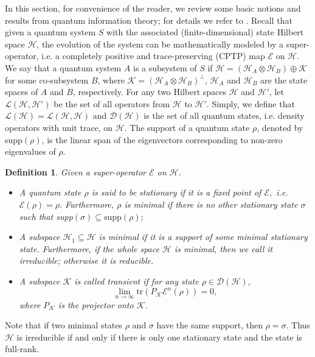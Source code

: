 \documentclass[journal]{IEEEtran}
\def\h{\ensuremath{\mathcal{H}}}
\def\l{\ensuremath{\mathcal{L}}}
\def\k{\ensuremath{\mathcal{K}}}
\def\e{\ensuremath{\mathcal{E}}}
\def\l{\ensuremath{\mathcal{L}}}
\def\d{\ensuremath{\mathcal{D}}}
\def\l{\mathcal{L}}
\def\k{\mathcal{K}}
\newtheorem{definition}{Definition}
\begin{document}
In this section, for convenience of the reader, we review some basic notions and results from quantum information theory; for details we refer to \cite{nielsen2010quantum}. Recall that given a quantum system $S$ with the associated (finite-dimensional) state Hilbert space $\h$, the evolution of the system can be mathematically  modeled by a super-operator, i.e. a completely positive  and trace-preserving (CPTP) map $\e$ on $\h$.  We say that a quantum system $A$ is a subsystem of $S$ if $\h=(\h_A\otimes\h_B)\oplus \k$ for some co-subsystem $B$, where $\k=(\h_A\otimes\h_B)^\perp$, $\h_A$ and $\h_B$ are the state spaces  of $A$ and $B$, respectively.  
  For any two Hilbert spaces $\h$ and $\h'$, let $\l(\h,\h')$ be the set of all  operators from $\h$ to $\h'$. Simply, we define that $\l(\h)=\l(\h,\h)$ and $\d(\h)$ is the set of all quantum states, i.e. density operators with unit trace, on $\h$.  The support of a quantum state $\rho$, denoted by supp$(\rho)$, is the linear span of the eigenvectors corresponding to non-zero eigenvalues of $\rho.$ 
\begin{definition}
  Given a super-operator $\e$ on $\h$. 
  \begin{itemize}
    \item[(1)] A quantum state  $\rho$ is said to be stationary if it is a fixed point of $\e,$ i.e. $\e(\rho)=\rho.$ Furthermore, $\rho$ is minimal if there is no other stationary state $\sigma$ such that supp$(\sigma)\subseteq \textrm{supp}(\rho);$
    \item[(2)] A subspace $\h_1\subseteq \h$ is minimal if it is a support of some minimal stationary state. Furthermore, if the whole space $\h$ is minimal, then we call it irreducible; otherwise it is reducible.
    \item[(3)] A subspace $\k$ is called transient if for any state $\rho\in \d(\h)$, $$\lim_{n\rightarrow \infty}\textrm{tr}(P_\k\e^n(\rho))=0,$$ where $P_\k$ is the projector onto $\k$. 
  \end{itemize} 
\end{definition}

Note that if two minimal states $\rho$ and $\sigma$ have the same support, then $\rho=\sigma$. Thus $\h$ is irreducible if and only if there is only one  stationary state and the state is full-rank.
\end{document}
